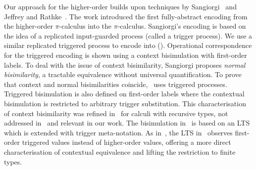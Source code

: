 Our approach for the higher-order builds upon techniques by Sangiorgi~\cite{SangiorgiD:expmpa,San96H}
and Jeffrey and Rathke~\cite{JeffreyR05}.
The work %
\cite{SangiorgiD:expmpa}
introduced the first fully-abstract encoding from the higher-order 
$\pi$-calculus into the $\pi$-calculus. 
Sangiorgi's encoding is based on the idea of a replicated input-guarded process 
(called a trigger process). We use a similar 
replicated triggered process 
to encode \HOp into \sessp ().
 Operational correspondence for
the triggered encoding is shown using a context bisimulation
with first-order labels.
To deal with the issue of context bisimilarity, 
Sangiorgi proposes \emph{normal bisimilarity}, 
a tractable  equivalence without universal quantification. 
To prove that context and normal bisimilarities coincide,~\cite{SangiorgiD:expmpa} uses 
triggered processes.
Triggered bisimulation is also defined on first-order labels
where the contextual bisimulation is restricted to arbitrary
trigger substitution. %
This
characterisation of context bisimilarity  was refined in~\cite{JeffreyR05} for
calculi with recursive types, not addressed in~\cite{San96H,SangiorgiD:expmpa} and
relevant in our work.
The
bisimulation in~\cite{JeffreyR05}
is based on an LTS which is extended with trigger meta-notation.
As in~\cite{San96H,SangiorgiD:expmpa}, 
the LTS in~\cite{JeffreyR05}
observes first-order triggered values instead of
higher-order values, offering a more direct characterisation of contextual equivalence
and lifting the restriction to finite types.

